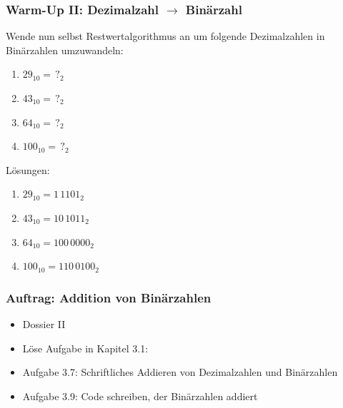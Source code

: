 \documentclass{beamer}
\begin{document}
\begin{frame}
    \frametitle{Warm-Up II: Dezimalzahl $\rightarrow$ Binärzahl}
    
    Wende nun selbst Restwertalgorithmus an um folgende Dezimalzahlen in Binärzahlen umzuwandeln:
    \begin{enumerate}
        \item $29_{10}  = \,?_2$ %
        \item $43_{10}  = \,?_2$ %
        \item $64_{10}  = \,?_2$ %
        \item $100_{10} = \,?_2$ %
    \end{enumerate}
    Lösungen:
    \begin{enumerate}
        \item $29_{10}  =   1\,1101_2$
        \item $43_{10}  =  10\,1011_2$
        \item $64_{10}  = 100\,0000_2$
        \item $100_{10} = 110\,0100_2$
    \end{enumerate}
\end{frame}


\begin{frame}
    \frametitle{Auftrag: Addition von Binärzahlen}

    \begin{itemize}
        \item Dossier II
        \item {}Löse Aufgabe in Kapitel 3.1:
        \item {}Aufgabe 3.7: Schriftliches Addieren von Dezimalzahlen und Binärzahlen
        \item {}Aufgabe 3.9: Code schreiben, der Binärzahlen addiert
    \end{itemize}
\end{frame}


\end{document}
